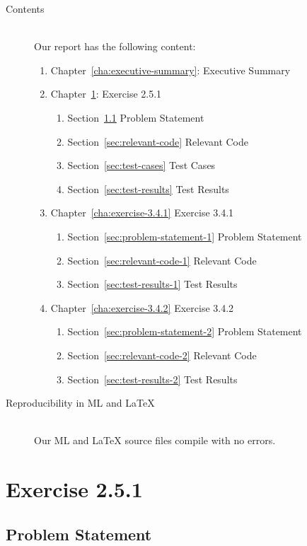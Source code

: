 \documentclass{report}
\begin{document}
\begin{description}
\item[Contents] \ \\
Our report has the following content:
\begin{enumerate}
 \item Chapter~\ref{cha:executive-summary}: Executive Summary
 \item Chapter~\ref{cha:exercise-2.5.1}: Exercise 2.5.1
   \begin{enumerate}
    \item Section~\ref{sec:problem-statement} Problem Statement
    \item Section~\ref{sec:relevant-code} Relevant Code
    \item Section~\ref{sec:test-cases} Test Cases
    \item Section~\ref{sec:test-results} Test Results
   \end{enumerate}
 \item Chapter~\ref{cha:exercise-3.4.1} Exercise 3.4.1
   \begin{enumerate}
    \item Section~\ref{sec:problem-statement-1} Problem Statement
    \item Section~\ref{sec:relevant-code-1} Relevant Code
    \item Section~\ref{sec:test-results-1} Test Results
   \end{enumerate}
 \item Chapter~\ref{cha:exercise-3.4.2} Exercise 3.4.2
   \begin{enumerate}
    \item Section~\ref{sec:problem-statement-2} Problem Statement
    \item Section~\ref{sec:relevant-code-2} Relevant Code
    \item Section~\ref{sec:test-results-2} Test Results
   \end{enumerate}
\end{enumerate}
\item[Reproducibility in ML and \LaTeX{}] \ \\
 Our ML and \LaTeX{} source files compile with no errors.
\end{description}

\chapter{Exercise 2.5.1}
\label{cha:exercise-2.5.1}

\section{Problem Statement}
\label{sec:problem-statement}
\end{document}
